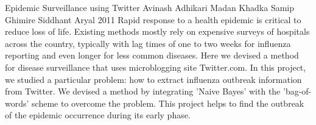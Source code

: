 \begin{conf-abstract}[]
{Epidemic Surveillance using Twitter}
{ 
Avinash Adhikari
Madan Khadka
Samip Ghimire
Siddhant Aryal
}
{2011}
Rapid response to a health epidemic is critical to reduce loss of life. Existing methods mostly rely on expensive surveys of hospitals across the country, typically with lag times of one to two weeks for influenza reporting and even longer for less common diseases. Here we devised a method for disease surveillance that uses microblogging site Twitter.com. In this project, we studied a particular problem: how to extract influenza outbreak information from Twitter. We devised a method by integrating 'Naive Bayes' with the 'bag-of-words' scheme to overcome the problem. This project helps to find the outbreak of the epidemic occurrence during its early phase.
\end{conf-abstract}